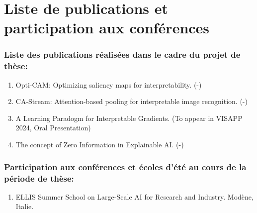 \newpage
\chapter*{Liste de publications et participation aux conférences}
\subsection*{Liste des publications réalisées dans le cadre du projet de thèse:}
\begin{enumerate}
    \item Opti-CAM: Optimizing saliency maps for interpretability. (-)
    \item CA-Stream: Attention-based pooling for interpretable image recognition. (-)
    \item A Learning Paradogm for Interpretable Gradients. (To appear in VISAPP 2024, Oral Presentation)
    \item The concept of Zero Information in Explainable AI. (-)
\end{enumerate}


\subsection*{Participation aux conférences et écoles d’été au cours de la période de thèse:}
\begin{enumerate}
\item ELLIS Summer School on Large-Scale AI for Research and Industry. Modène, Italie.
\end{enumerate}
